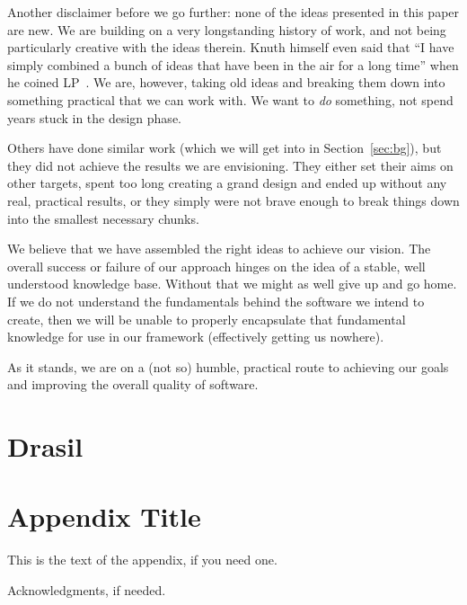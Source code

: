 \documentclass[preprint, 10pt]{sigplanconf}
\begin{document}
Another disclaimer before we go further: none of the ideas presented
in this paper are new. We are building on a very longstanding history of work,
and not being particularly creative with the ideas therein. Knuth himself even
said that ``I have simply combined a bunch of ideas that have been in the air
for a long time'' when he coined LP~\cite{Knuth1984}. We are, however, taking old
ideas and breaking them down into something practical that we can work with. We
want to \emph{do} something, not spend years stuck in the design phase.

Others have done similar work (which we will get into in Section~\ref{sec:bg}),
but they did not achieve the results we are envisioning. They either set their
aims on other targets, spent too long creating a grand design and ended up
without any real, practical results, or they simply were not brave enough to
break things down into the smallest necessary chunks.

We believe that we have assembled the right ideas to achieve our vision.
The overall success or failure of our approach hinges on the idea of a stable,
well understood knowledge base. Without that we might as well give up and go
home. If we do not understand the fundamentals behind the software we intend to
create, then we will be unable to properly encapsulate that fundamental
knowledge for use in our framework (effectively getting us nowhere).

As it stands, we are on a (not so) humble, practical route to achieving our
goals and improving the overall quality of software.

\section{Drasil}
\label{sec:Drasil}





\appendix
\section{Appendix Title}

This is the text of the appendix, if you need one.

\acks

Acknowledgments, if needed.




%
%
%
%
\end{document}
